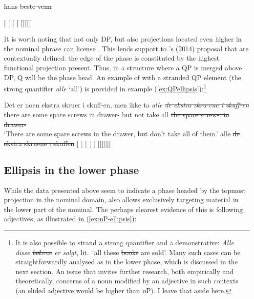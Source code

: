 \documentclass[output=paper]{langsci/langscibook}
\begin{document}
\ea\label{ex:illustDPell}
	hans \sout{beste venn}

	[ [ [ [ []]]]]
\z

\noindent It is worth noting that not only DP, but also projections located
even higher in the nominal phrase can license . This lends support to
\citeauthor{Boskovic2014}'s (2014) proposal that  are contextually
defined: the edge of the phase is constituted by the highest functional
projection present. Thus, in a structure where a QP is merged above DP, Q will
be the phase head. An example of  with a stranded QP element (the
strong quantifier \emph{alle} `all') is provided in example
(\ref{ex:QPellipsis}):\footnote{It is also possible to strand a strong
    quantifier and a demonstrative: \emph{Alle disse \sout{bøkene} er solgt},
lit.\ `all these \sout{books} are sold'.  Many such cases can be
straightforwardly analysed as  in the lower phase, which is discussed
in the next section. An issue that invites further research, both
empirically and theoretically, concerns  of a noun modified by an
adjective in such contexts (an elided adjective would be higher than
\emph{n}P).  I leave that  aside here.}

\ea\label{ex:QPellipsis} 
    \ea
    \gll Det er noen ekstra skruer i skuff-en, men ikke ta  \textit{alle}
    \textit{\sout{de ekstra skru-ene i skuff-en}}\\
	there are some spare screws in drawer-\Def{} but not take all \sout{the spare screw-\Pl.\Def{} in drawer-\Def{}}\\
    \glt `There are some spare screws in the drawer, but don't take all of them.'
    \ex alle \sout{de ekstra skruene i skuffen}
		[ [ [ [ [ []]]]]]
    \z
\z

\subsection{Ellipsis in the lower phase}

While the data presented above seem to indicate a phase headed by the topmost
projection in the nominal domain,  also allows  exclusively
targeting material in the lower part of the nominal. The perhaps clearest
evidence of this is  following adjectives, as illustrated in
(\ref{ex:nP-ellipsis}):\largerpage[-2]
\end{document}
